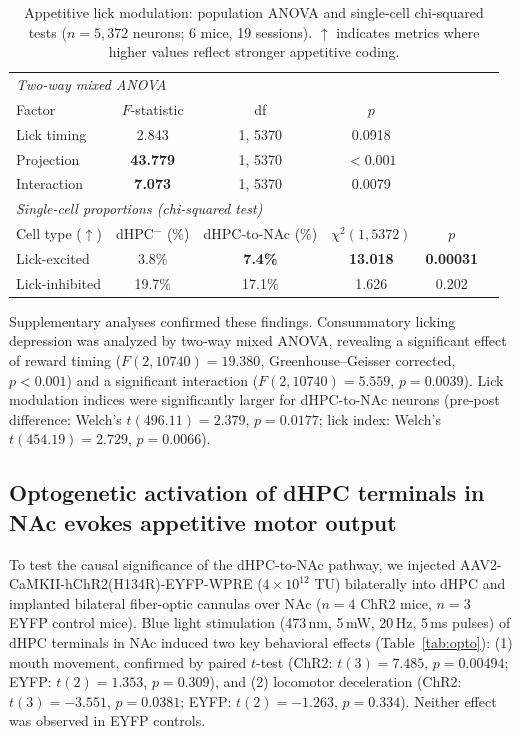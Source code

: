 \documentclass[11pt]{article}
\begin{document}
\begin{table}[H]
\centering
\caption{Appetitive lick modulation: population ANOVA and single-cell chi-squared tests ($n=5{,}372$ neurons; 6 mice, 19 sessions). $\uparrow$ indicates metrics where higher values reflect stronger appetitive coding.}
\label{tab:licking}
\begin{tabular}{lccccc}
\toprule
\multicolumn{6}{l}{\textit{Two-way mixed ANOVA}} \\
Factor & $F$-statistic & df & $p$ \\
\midrule
Lick timing & 2.843 & 1, 5370 & 0.0918 \\
Projection & \textbf{43.779} & 1, 5370 & $<0.001$ \\
Interaction & \textbf{7.073} & 1, 5370 & 0.0079 \\
\midrule
\multicolumn{6}{l}{\textit{Single-cell proportions (chi-squared test)}} \\
Cell type ($\uparrow$) & dHPC$^{-}$ (\%) & dHPC-to-NAc (\%) & $\chi^{2}(1, 5372)$ & $p$ \\
\midrule
Lick-excited & 3.8\% & \textbf{7.4\%} & \textbf{13.018} & \textbf{0.00031} \\
Lick-inhibited & 19.7\% & 17.1\% & 1.626 & 0.202 \\
\bottomrule
\end{tabular}
\end{table}

Supplementary analyses confirmed these findings. Consummatory licking depression was analyzed by two-way mixed ANOVA, revealing a significant effect of reward timing ($F(2, 10740)=19.380$, Greenhouse--Geisser corrected, $p<0.001$) and a significant interaction ($F(2, 10740)=5.559$, $p=0.0039$). Lick modulation indices were significantly larger for dHPC-to-NAc neurons (pre-post difference: Welch's $t(496.11)=2.379$, $p=0.0177$; lick index: Welch's $t(454.19)=2.729$, $p=0.0066$).

\subsection{Optogenetic activation of dHPC terminals in NAc evokes appetitive motor output}

To test the causal significance of the dHPC-to-NAc pathway, we injected AAV2-CaMKII-hChR2(H134R)-EYFP-WPRE ($4 \times 10^{12}$ TU) bilaterally into dHPC and implanted bilateral fiber-optic cannulas over NAc ($n=4$ ChR2 mice, $n=3$ EYFP control mice). Blue light stimulation (473\,nm, 5\,mW, 20\,Hz, 5\,ms pulses) of dHPC terminals in NAc induced two key behavioral effects (Table~\ref{tab:opto}): (1) mouth movement, confirmed by paired $t$-test (ChR2: $t(3)=7.485$, $p=0.00494$; EYFP: $t(2)=1.353$, $p=0.309$), and (2) locomotor deceleration (ChR2: $t(3)=-3.551$, $p=0.0381$; EYFP: $t(2)=-1.263$, $p=0.334$). Neither effect was observed in EYFP controls.
\end{document}
